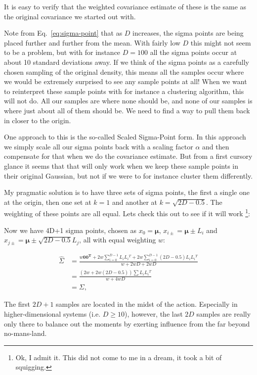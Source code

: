 It is easy to verify that the weighted covariance estimate of these
is the same as the original covariance we started out with.

Note from Eq.~\ref{eq:sigma-point} that as $D$ increases, the sigma
points are being placed further and further from the mean. With fairly
low $D$ this might not seem to be a problem, but with for instance
$D=100$ all the sigma points occur at about 10 standard deviations
away. If we think of the sigma points as a carefully chosen sampling
of the original density, this means all the samples occur where we
would be extremely surprised to see any sample points at all! When
we want to reinterpret these sample points with for instance a clustering
algorithm, this will not do. All our samples are where none should
be, and none of our samples is where just about all of them should
be. We need to find a way to pull them back in closer to the origin.

One approach to this is the so-called Scaled Sigma-Point form. In
this approach we simply scale all our sigma points back with a scaling
factor $\alpha$ and then compensate for that when we do the covariance
estimate. But from a first cursory glance it seems that that will
only work when we keep these sample points in their original Gaussian,
but not if we were to for instance cluster them differently.

My pragmatic solution is to have three sets of sigma points, the first
a single one at the origin, then one set at $k=1$ and another at
$k=\sqrt{2D-0.5}$. The weighting of these points are all equal. Lets
check this out to see if it will work%
\footnote{Ok, I admit it. This did not come to me in a dream, it took a bit
of squigging. %
}:

Now we have 4D+1 sigma points, chosen as $x_{0}=\mathbf{\mu}$, $x_{i\pm}=\mathbf{\mu}\pm L_{i}$
and $x_{j\pm}=\mathbf{\mu}\pm\sqrt{2D-0.5}L_{j}$, all with equal
weighting $w$:

\begin{align*}
\hat{\Sigma} & =\frac{w\mathbf{00^{T}}+2w\sum_{i=0}^{D-1}L{}_{i}L{}_{i}{}^{T}+2w\sum_{i=0}^{D-1}(2D-0.5)L{}_{i}L{}_{i}{}^{T}}{w+2wD+2wD}\\
 & =\frac{\left(2w+2w(2D-0.5)\right)\sum L{}_{i}L{}_{i}{}^{T}}{w+4wD}\\
 & =\Sigma,
\end{align*}


The first $2D+1$ samples are located in the midst of the action.
Especially in higher-dimensional systems (i.e. $D\geq10$), however,
the last $2D$ samples are really only there to balance out the moments
by exerting influence from the far beyond no-mans-land.


